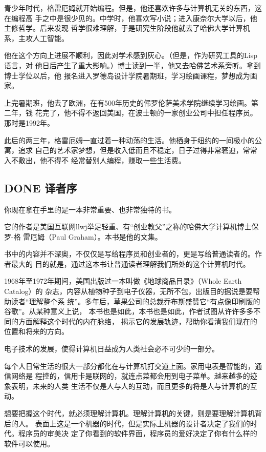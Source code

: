 \documentclass[11pt]{ctexart}
\begin{document}
{{{{青少年时代，格雷厄姆就开始编程。但是，他还喜欢许多与计算机无关的东西，这在编程高
手之中是很少见的。中学时，他喜欢写小说；进入康奈尔大学以后，他主修哲学。后来发现
哲学很难理解，于是研究生阶段他就去了哈佛大学计算机系，主攻人工智能。

他在这个方向上进展不顺利，因此对学术感到灰心。（但是，作为研究工具的Lisp语言，对
他日后产生了重大影响。）博士读到一半，他又去哈佛艺术系旁听。拿到博士学位以后，他
报名进入罗德岛设计学院暑期班，学习绘画课程，梦想成为画家。

上完暑期班，他去了欧洲，在有500年历史的伄罗伦萨美术学院继续学习绘画。第二年，钱
花完了，他不得不返回美国，在波士顿的一家创业公司中担任程序员。那时是1992年。

此后的两三年，格雷厄姆一直过着一种动荡的生活。他栖身于纽约的一间极小的公寓，追求
自己的艺术家梦想，但是收入低而且不稳定，日子过得非常窘迫，常常入不敷出，他不得不
经常替别人编程，赚取一些生活费。

\subsection{{\bfseries\sffamily DONE} 译者序}
\label{sec:org5d4f711}
你现在拿在手里的是一本非常重要、也非常独特的书。

它的作者是美国互联网llwj举足轻重、有“创业教父”之称的哈佛大学计算机博士保罗-格
雷厄姆（Paul Graham）。本书是他的文集。

书中的内容并不深奥，不仅仅是写给程序员和创业者的，更是写给普通读者的。作者最大的
目的就是，通过这本书让普通读者理解我们所处的这个计算机时代。

1968年至1972年期间，美国出版过一本叫做《地球商品目录》（Whole Earth Catalog）的
杂志，内容从植物种子到电子仪器，无所不包，出版目的据说是要帮助读者“理解整个系
统”。多年后，草果公司的总裁乔布斯盛赞它“有点像印刷版的谷歌”。从某种意义上说，
本书也是如此，本书也是如此，作者试图从许许多多不同的方面解释这个时代的内在脉络，
揭示它的发展轨迹，帮助你看清我们现在的位置和将来的方向。

电子技术的发展，使得计算机日益成为人类社会必不可少的一部分。

每个人日常生活的很大一部分都化在与计算机打交道上面。家用电表是智能的，通信网络是
程控的，信用卡是联网的，就连点菜都会用到电子菜单。越来越多的迹象表明，未来的人类
生活不仅是人与人的互动，而且更多的将是人与计算机的互动。

想要把握这个时代，就必须理解计算机。理解计算机的关键，则是要理解计算机背后的人。
表面上这是一个机器的时代，但是实际上机器的设计者决定了我们的时代。程序员的审美决
定了你看到的软件界面，程序员的爱好决定了你有什么样的软件可以使用。

}}}}
\end{document}
